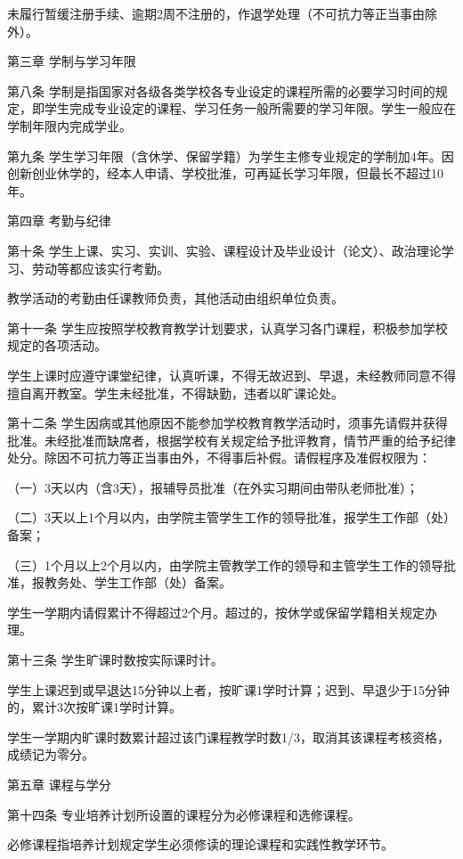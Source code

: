 \documentclass[UTF8,12pt,a4paper]{report}
\begin{document}
未履行暂缓注册手续、逾期2周不注册的，作退学处理（不可抗力等正当事由除外）。



第三章  学制与学习年限

第八条  学制是指国家对各级各类学校各专业设定的课程所需的必要学习时间的规定，即学生完成专业设定的课程、学习任务一般所需要的学习年限。学生一般应在学制年限内完成学业。

第九条  学生学习年限（含休学、保留学籍）为学生主修专业规定的学制加4年。因创新创业休学的，经本人申请、学校批淮，可再延长学习年限，但最长不超过10年。　　



第四章  考勤与纪律

第十条  学生上课、实习、实训、实验、课程设计及毕业设计（论文）、政治理论学习、劳动等都应该实行考勤。

教学活动的考勤由任课教师负责，其他活动由组织单位负责。

第十一条  学生应按照学校教育教学计划要求，认真学习各门课程，积极参加学校规定的各项活动。

学生上课时应遵守课堂纪律，认真听课，不得无故迟到、早退，未经教师同意不得擅自离开教室。学生未经批准，不得缺勤，违者以旷课论处。

第十二条  学生因病或其他原因不能参加学校教育教学活动时，须事先请假并获得批准。未经批准而缺席者，根据学校有关规定给予批评教育，情节严重的给予纪律处分。除因不可抗力等正当事由外，不得事后补假。请假程序及准假权限为：

（一）3天以内（含3天），报辅导员批准（在外实习期间由带队老师批准）；

（二）3天以上1个月以内，由学院主管学生工作的领导批准，报学生工作部（处）备案；

（三）1个月以上2个月以内，由学院主管教学工作的领导和主管学生工作的领导批准，报教务处、学生工作部（处）备案。

学生一学期内请假累计不得超过2个月。超过的，按休学或保留学籍相关规定办理。

第十三条  学生旷课时数按实际课时计。

学生上课迟到或早退达15分钟以上者，按旷课1学时计算；迟到、早退少于15分钟的，累计3次按旷课1学时计算。

学生一学期内旷课时数累计超过该门课程教学时数1/3，取消其该课程考核资格，成绩记为零分。



第五章  课程与学分

第十四条  专业培养计划所设置的课程分为必修课程和选修课程。

必修课程指培养计划规定学生必须修读的理论课程和实践性教学环节。
\end{document}

